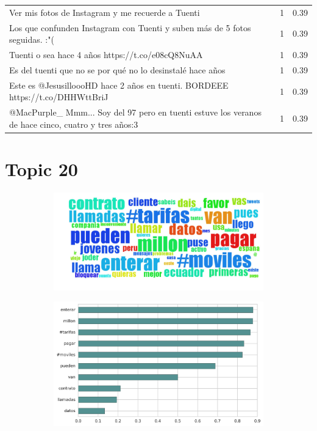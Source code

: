 \begin{longtable}{p{12.5cm}rr}
Ver mis fotos de Instagram y me recuerde a Tuenti & 1 & 0.39 \\
Los que confunden Instagram con Tuenti y suben más de 5 fotos seguidas. :"( & 1 & 0.39 \\
Tuenti o sea hace 4 años https://t.co/e08cQ8NuAA & 1 & 0.39 \\
Es del tuenti que no se por qué no lo desinstalé hace años & 1 & 0.39 \\
Este es @JesusilloooHD hace 2 años en tuenti. BORDEEE https://t.co/DHHWttBriJ & 1 & 0.39 \\
@MacPurple\_ Mmm... Soy del 97 pero en tuenti estuve los veranos de hace cinco, cuatro y tres años:3 & 1 & 0.39 \\

\end{longtable}
\clearpage

\section{Topic 20}

\begin{figure}[htbp!]
    \centering
    \begin{subfigure}[b]{0.49\textwidth}
        \includegraphics[width=\textwidth]{twitter_all/report_images/topic-20-wordcloud.jpg}
    \end{subfigure}
    \begin{subfigure}[b]{0.49\textwidth}
        \includegraphics[width=\textwidth]{twitter_all/report_images/topic-20-terms.jpg}
    \end{subfigure}
\end{figure}

